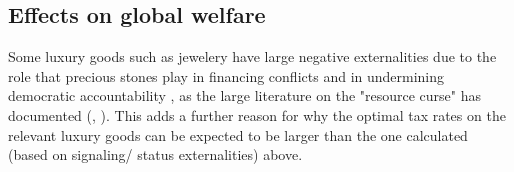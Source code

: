\documentclass{article}
\begin{document}

\subsection{Effects on global welfare }

Some luxury goods such as jewelery have large negative externalities due to the role that precious stones play in financing conflicts \citet{binzel2023diamond} and in undermining democratic accountability \citet{bhattacharyya2010natural}, as the large literature on the "resource curse" has documented (\citet{olsson2007conflict}, \citet{blair2021commodity}). This adds a further reason for why the optimal tax rates on the relevant luxury goods can be expected to be larger than the one calculated (based on signaling/ status externalities) above.
\end{document}
